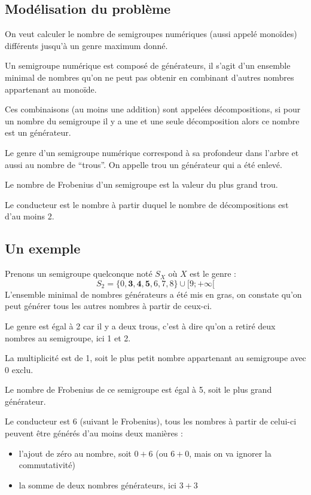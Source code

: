 \documentclass[12pt,a4paper]{article}
\begin{document}
\subsection*{Modélisation du problème}
On veut calculer le nombre de semigroupes numériques (aussi appelé monoïdes) différents jusqu'à un genre maximum donné.

Un semigroupe numérique est composé de générateurs, il s'agit d'un ensemble minimal de nombres qu'on ne peut pas obtenir en combinant d'autres nombres appartenant au monoïde.

Ces combinaisons (au moins une addition) sont appelées décompositions, si pour un nombre du semigroupe il y a une et une seule décomposition alors ce nombre est un générateur.

Le genre d'un semigroupe numérique correspond à sa profondeur dans l'arbre et aussi au nombre de ``trous''. On appelle trou un générateur qui a été enlevé.

Le nombre de Frobenius d'un semigroupe est la valeur du plus grand trou.

Le conducteur est le nombre à partir duquel le nombre de décompositions est d'au moins 2.

\subsection*{Un exemple}

Prenons un semigroupe quelconque noté $S_X$ où $X$ est le genre :
\[ S_2 = \{0, \mathbf{3}, \mathbf{4}, \mathbf{5}, 6, 7, 8\} \cup [9; +\infty[ \]
L'ensemble minimal de nombres générateurs a été mis en gras, on constate qu'on peut générer tous les autres nombres à partir de ceux-ci.

Le genre est égal à 2 car il y a deux trous, c'est à dire qu'on a retiré deux nombres au semigroupe, ici 1 et 2.

La multiplicité est de 1, soit le plus petit nombre appartenant au semigroupe avec 0 exclu.

Le nombre de Frobenius de ce semigroupe est égal à 5, soit le plus grand générateur.

Le conducteur est 6 (suivant le Frobenius), tous les nombres à partir de celui-ci peuvent être générés d'au moins deux manières :
\begin{itemize}
	\item	l'ajout de zéro au nombre, soit $0 + 6$ (ou $6 + 0$, mais on va ignorer la commutativité)
	\item	la somme de deux nombres générateurs, ici $3 + 3$
\end{itemize}
\end{document}
